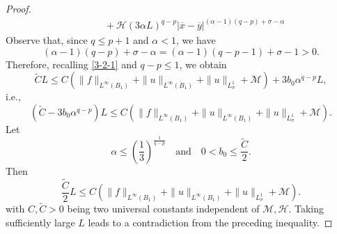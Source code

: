 \documentclass[10pt,a4paper]{amsart}
\begin{document}
\begin{proof}
\begin{equation}
\begin{split}
&\qquad+\mathcal{H}(3\alpha L)^{q-p}|\overline{x}-\overline{y}|^{(\alpha-1)(q-p)+\sigma-\alpha}
\end{split}
\end{equation}
Observe that, since $q\le p+1$ and $\alpha<1$, we have
$$
(\alpha-1)(q-p)+\sigma-\alpha=(\alpha-1)(q-p-1)+\sigma-1>0.
$$
Therefore, recalling \eqref{3-2-1} and $q-p\le1$, we obtain
$$
\widetilde{C}L\le C(\|f\|_{L^\infty(B_1)}+\|u\|_{L^\infty(B_1)}+\|u\|_{L^1_\sigma}+\mathcal{M})+3b_0\alpha ^{q-p}L,
$$
i.e.,
$$
(\widetilde{C}-3b_0\alpha ^{q-p})L\le C(\|f\|_{L^\infty(B_1)}+\|u\|_{L^\infty(B_1)}+\|u\|_{L^1_\sigma}+\mathcal{M}).
$$
Let
$$
\alpha\le\left(\frac{1}{3}\right)^\frac{1}{q-p} \quad\text{and}\quad  0<b_0\le\frac{\widetilde{C}}{2}.
$$
Then
$$
\frac{\widetilde{C}}{2}L\le C(\|f\|_{L^\infty(B_1)}+\|u\|_{L^\infty(B_1)}+\|u\|_{L^1_\sigma}+\mathcal{M}).
$$
with $C,\widetilde{C}>0$ being two universal constants independent of $\mathcal{M},\mathcal{H}$. Taking sufficiently large $L$ leads to a contradiction from the preceding inequality.
\end{proof}
\end{document}
